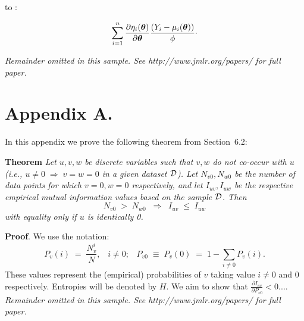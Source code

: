 \documentclass[twoside,11pt]{article}
\newcommand{\dataset}{{\cal D}}
\newcommand{\fracpartial}[2]{\frac{\partial #1}{\partial  #2}}
\begin{document}
to :

\begin{equation}
    \sum_{i=1}^n \frac{\partial\eta_i({\bm{\theta}})}{\partial{\bm{\theta}}}\frac{(Y_i - \mu_i({\bm{\theta}}))}{\phi}\cdot
    \label{eqn:generalized-linear-models-cannonical}
\end{equation}


{\noindent \em Remainder omitted in this sample. See http://www.jmlr.org/papers/ for full paper.}




\newpage

\appendix
\section*{Appendix A.}
\label{app:theorem}



In this appendix we prove the following theorem from
Section~6.2:

\noindent
{\bf Theorem} {\it Let $u,v,w$ be discrete variables such that $v, w$ do
not co-occur with $u$ (i.e., $u\neq0\;\Rightarrow \;v=w=0$ in a given
dataset $\dataset$). Let $N_{v0},N_{w0}$ be the number of data points for
which $v=0, w=0$ respectively, and let $I_{uv},I_{uw}$ be the
respective empirical mutual information values based on the sample
$\dataset$. Then
\[
	N_{v0} \;>\; N_{w0}\;\;\Rightarrow\;\;I_{uv} \;\leq\;I_{uw}
\]
with equality only if $u$ is identically 0.} \hfill\BlackBox

\noindent
{\bf Proof}. We use the notation:
\[
P_v(i) \;=\;\frac{N_v^i}{N},\;\;\;i \neq 0;\;\;\;
P_{v0}\;\equiv\;P_v(0)\; = \;1 - \sum_{i\neq 0}P_v(i).
\]
These values represent the (empirical) probabilities of $v$
taking value $i\neq 0$ and 0 respectively.  Entropies will be denoted
by $H$. We aim to show that $\fracpartial{I_{uv}}{P_{v0}} < 0$....\\

{\noindent \em Remainder omitted in this sample. See http://www.jmlr.org/papers/ for full paper.}


\vskip 0.2in

\end{document}

